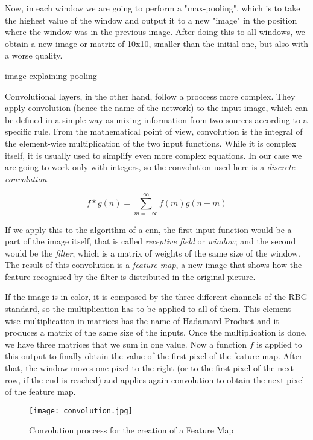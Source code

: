 Now, in each window we are going to perform a "max-pooling", which is to take the highest value of the window and output it to a new "image" in the position where the window was in the previous image. After doing this to all windows, we obtain a new image or matrix of 10x10, smaller than the initial one, but also with a worse quality.

image explaining pooling

Convolutional layers, in the other hand, follow a proccess more complex. They apply convolution (hence the name of the network) to the input image, which can be defined in a simple way as mixing information from two sources according to a specific rule. From the mathematical point of view, convolution is the integral of the element-wise multiplication of the two input functions. While it is complex itself, it is usually used to simplify even more complex equations. In our case we are going to work only with integers, so the convolution used here is a \textit{discrete convolution}. 

\begin{equation}
	\label{discrete_conv}
	f*g(n) = \sum_{m= -\infty}^{\infty} f(m) g(n-m) 
\end{equation}

If we apply this to the algorithm of a \gls{cnn}, the first input function would be a part of the image itself, that is called \textit{receptive field} or \textit{window}; and the second would be the \textit{filter}, which is a matrix of weights of the same size of the window. The result of this convolution is a \textit{feature map}, a new image that shows how the feature recognised by the filter is distributed in the original picture. 

If the image is in color, it is composed by the three different channels of the RBG standard, so the multiplication has to be applied to all of them. This element-wise multiplication in matrices has the name of Hadamard Product and it produces a matrix of the same size of the inputs. Once the multiplication is done, we have three matrices that we sum in one value. Now a function $f$ is applied to this output to finally obtain the value of the first pixel of the feature map. After that, the window moves one pixel to the right (or to the first pixel of the next row, if the end is reached) and applies again convolution to obtain the next pixel of the feature map. 

\begin{figure}[ht]
	\centering
	\texttt{[image: convolution.jpg]}
	\caption{Convolution proccess for the creation of a Feature Map}
	\label{fig:convol_creation_feature_map}
\end{figure}

